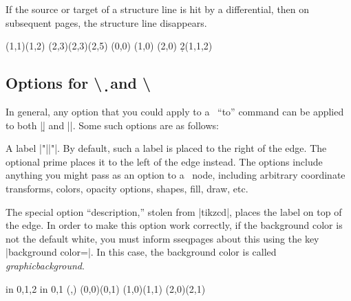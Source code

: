\documentclass{ltxdoc}
\makeatletter
\def\sectionstring{\textbackslash\@xp\@gobble\string}
\newenvironment{manualentry}[1]{
    \begin{pgfmanualentry}
    \pgfmanualentryheadline{#1}
    \pgfmanualbody
}{
    \end{pgfmanualentry}
}
\makeatother
\begin{document}
\begin{sseqdata}[name=ex1,degree={#1}{1-#1}]
\begin{command}{\structline{}}
If the source or target of a structure line is hit by a differential, then on subsequent pages, the structure line disappears.
\begin{codeexample}[width=9cm]
\sseqnewgroup{}
\begin{sseqdata}[name=structline example,
                 classes={circle,fill},
                 Adams grading, no axes]
\class(1,1)\class(1,2)
\class(2,3)\class(2,3)\class(2,5)
\tower[classes=blue](0,0)
\tower[struct lines=dashed,orange](1,0)
\tower[struct lines=red](2,0)
\d2(1,1,2)
\end{sseqdata}
\printpage[name=structline example,page=2]
\hskip1cm
\printpage[name=structline example,page=3]
\end{codeexample}
\end{command}
\subsection{Options for \sectionstring\d\ and \sectionstring\structline}
In general, any option that you could apply to a \tikzname\ ``to'' command can be applied to both |\d| and |\structline|. Some such options are as follows:
\begin{manualentry}{|"|\meta{text}|"|\opt{\ttfamily '}\opt{\meta{options}}}
A label |"||"|. By default, such a label is placed to the right of the edge. The optional prime places it to the left of the edge instead. The options include anything you might pass as an option to a \tikzname\ node, including arbitrary coordinate transforms, colors, opacity options, shapes, fill, draw, etc.
    
The special option ``description,'' stolen from |tikzcd|, places the label on top of the edge. In order to make this option work correctly, if the background color is not the default white, you must inform sseqpages about this using the key |background color=|. In this case, the background color is called \textit{graphicbackground}.
\begin{codeexample}[]
\begin{sseqpage}[background color=graphicbackground, no axes]
\foreach\x in {0,1,2} \foreach\y in {0,1}{
    \class(\x,\y)
}
\structline["a" red](0,0)(0,1)
\structline["a'"'blue,"b"{yshift=1em}](1,0)(1,1)
\structline["c" description](2,0)(2,1)
\end{sseqpage}
\end{codeexample}
\end{manualentry}


\end{sseqdata}
\end{document}
